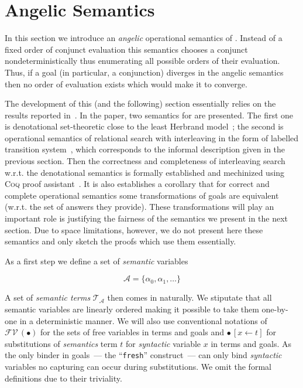\section{Angelic Semantics}
\label{sec:angelic-semantics}

In this section we introduce an \emph{angelic} operational semantics of \mk. Instead of a fixed order of conjunct evaluation this semantics chooses a conjunct nondeterministically
thus enumerating all possible orders of their evaluation. Thus, if a goal (in particular, a conjunction) diverges in the angelic semantics then no order of evaluation exists which
would make it to converge.

The development of this (and the following) section essentially relies on the results reported in~\cite{fair:semantics}. In the paper, two semantics for \mk are presented. The first one is
denotational set-theoretic close to the least Herbrand model~\cite{Lloyd}; the second is operational semantics of relational search with interleaving in the form of labelled transition
system~\cite{LTS}, which corresponds to the informal description given in the previous section. Then the correctness and completeness of interleaving search w.r.t. the denotational semantics
is formally established and mechinized using \textsc{Coq} proof assistant~\cite{Coq}. It is also establishes a corollary that for correct and complete operational semantics some
transformations of goals are equivalent (w.r.t. the set of answers they provide). These transformations will play an important role is justifying the fairness of the semantics we present
in the next section. Due to space limitations, however, we do not present here these semantics and only sketch the proofs which use them essentially.
 
As a first step we define a set of \emph{semantic} variables

\[
\mathcal{A}=\{\alpha_0,\alpha_1,\dots\}
\]

A set of \emph{semantic terms} $\mathcal{T}_{\mathcal A}$ then comes in naturally. We stiputate that all semantic variables are linearly ordered making it possible to take them one-by-one
in a deterministic manner. We will also use conventional notations of $\mathcal{FV}\,(\bullet)$ for the sets of free variables in terms and goals and $\bullet\,[x\gets t]$ for substitutions
of \emph{semantics} term $t$ for \emph{syntactic} variable $x$ in terms and goals. As the only binder in goals~--- the ``\lstinline|fresh|'' construct~--- can only bind \emph{syntactic}
variables no capturing can occur during substitutions. We omit the formal definitions due to their triviality.

